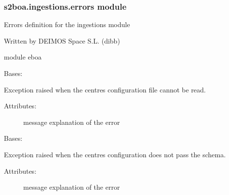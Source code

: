 \subsubsection{s2boa.ingestions.errors module}
\label{\detokenize{s2boa.ingestions:module-s2boa.ingestions.errors}}\label{\detokenize{s2boa.ingestions:s2boa-ingestions-errors-module}}
\sphinxAtStartPar
Errors definition for the ingestions module

\sphinxAtStartPar
Written by DEIMOS Space S.L. (dibb)

\sphinxAtStartPar
module eboa

\begin{fulllineitems}
\label{\detokenize{s2boa.ingestions:s2boa.ingestions.errors.CentresConfigCannotBeRead}}
\sphinxAtStartPar
Bases: {\hyperref[\detokenize{s2boa.ingestions:s2boa.ingestions.errors.Error}]{}}

\sphinxAtStartPar
Exception raised when the centres configuration file cannot be read.
\begin{description}
\item[{Attributes:}] \leavevmode
\sphinxAtStartPar
message \textendash{} explanation of the error

\end{description}

\end{fulllineitems}


\begin{fulllineitems}
\label{\detokenize{s2boa.ingestions:s2boa.ingestions.errors.CentresConfigDoesNotPassSchema}}
\sphinxAtStartPar
Bases: {\hyperref[\detokenize{s2boa.ingestions:s2boa.ingestions.errors.Error}]{}}

\sphinxAtStartPar
Exception raised when the centres configuration does not pass the schema.
\begin{description}
\item[{Attributes:}] \leavevmode
\sphinxAtStartPar
message \textendash{} explanation of the error

\end{description}

\end{fulllineitems}

